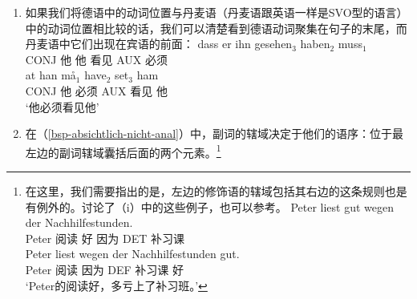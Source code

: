 \begin{enumerate}
\addlines[-1]
\item 如果我们将德语中的动词位置与丹麦语（丹麦语跟英语一样是SVO型的语言）中的动词位置相比较的话，我们可以清楚看到德语动词聚集在句子的末尾，而丹麦语中它们出现在宾语的前面\citep[]{Oersnes2009b}：
\eal
\ex 
\gll dass er ihn gesehen$_3$ haben$_2$ muss$_1$\\
	 CONJ 他 他 看见 AUX 必须\\
\ex 
\gll at han må$_1$ have$_2$ set$_3$ ham\\
     CONJ 他 必须 AUX 看见 他\\
\glt `他必须看见他'
\zl
\pagebreak
\item\label{SOV-Skopus} 在（\ref{bsp-absichtlich-nicht-anal}）中，副词的辖域决定于他们的语序：位于最左边的副词辖域囊括后面的两个元素。\footnote{%
在这里，我们需要指出的是，左边的修饰语的辖域包括其右边的这条规则也是有例外的。\citet*[]{Kasper94a}讨论了（i）中的这些例子，也可以参考\citet*[]{BV72}。
\eal
\label{bsp-peter-liest-gut-wegen}
\ex 
\gll Peter liest gut wegen der Nachhilfestunden.\\
	 Peter 阅读 好 因为 DET 补习课\\
\ex 
\gll Peter liest wegen der Nachhilfestunden gut.\\
	 Peter 阅读 因为 DEF 补习课 好\\
\glt `Peter的阅读好，多亏上了补习班。'
}
\end{enumerate}
